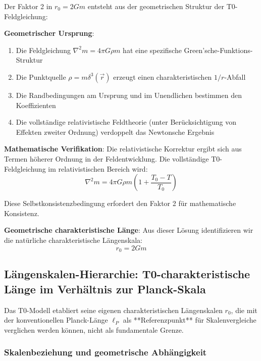 \documentclass[12pt,a4paper]{article}
\begin{document}
Der Faktor 2 in $r_0 = 2Gm$ entsteht aus der geometrischen Struktur der T0-Feldgleichung:

\textbf{Geometrischer Ursprung}:
\begin{enumerate}
	\item Die Feldgleichung $\nabla^2 m = 4\pi G \rho m$ hat eine spezifische Green'sche-Funktions-Struktur
	\item Die Punktquelle $\rho = m \delta^3(\vec{r})$ erzeugt einen charakteristischen $1/r$-Abfall
	\item Die Randbedingungen am Ursprung und im Unendlichen bestimmen den Koeffizienten
	\item Die vollständige relativistische Feldtheorie (unter Berücksichtigung von Effekten zweiter Ordnung) verdoppelt das Newtonsche Ergebnis
\end{enumerate}

\textbf{Mathematische Verifikation}:
Die relativistische Korrektur ergibt sich aus Termen höherer Ordnung in der Feldentwicklung. Die vollständige T0-Feldgleichung im relativistischen Bereich wird:
\begin{equation}
	\nabla^2 m = 4\pi G \rho m \left(1 + \frac{T_0 - T}{T_0}\right)
\end{equation}

Diese Selbstkonsistenzbedingung erfordert den Faktor 2 für mathematische Konsistenz.

\textbf{Geometrische charakteristische Länge}: Aus dieser Lösung identifizieren wir die natürliche charakteristische Längenskala:
\begin{equation}
	\boxed{r_0 = 2Gm}
\end{equation}

\subsection{Längenskalen-Hierarchie: T0-charakteristische Länge im Verhältnis zur Planck-Skala}
\label{subsec:planck_comparison}

Das T0-Modell etabliert seine eigenen charakteristischen Längenskalen $r_0$, die mit der konventionellen Planck-Länge $\ell_P$ als **Referenzpunkt** für Skalenvergleiche verglichen werden können, nicht als fundamentale Grenze.

\subsubsection{Skalenbeziehung und geometrische Abhängigkeit}
\label{subsubsec:scale_relationship}
\end{document}

